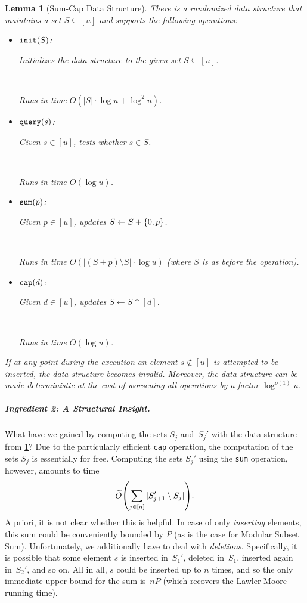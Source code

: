 \documentclass[10pt,a4paper]{article}
\newtheorem{lemma}{Lemma}[section]
\DeclarePairedDelimiter\parens{\lparen}{\rparen}
\DeclarePairedDelimiter\set{\lbrace}{\rbrace}
\newcommand\Order{O}
\newcommand\order{o}
\newcommand\Oo{O}
\newcommand{\Op}[1]{{\normalfont\texttt{#1}}}
\begin{document}
\begin{lemma}[Sum-Cap Data Structure]
    \label{lem:set_ds}
    There is a randomized data structure that maintains a set $S \subseteq [u]$ and supports the following operations:
    \smallskip
    \begin{itemize} 
        \item \parbox{2.2cm}{$\Op{init}(S)$:} Initializes the data structure to the given set $S \subseteq [u]$.\\\parbox{2.2cm}{~} Runs in time $\Oo(|S| \cdot \log u + \log^2 u)$.
        
        \item \parbox{2.2cm}{$\Op{query}(s)$:} Given $s \in [u]$, tests whether $s \in S$.\\\parbox{2.2cm}{~} Runs in time $\Oo(\log u)$.
        
        \item \parbox{2.2cm}{$\Op{sum}(p)$:} Given $p \in [u]$, updates $S \gets S + \set{0, p}$.\\\parbox{2.2cm}{~} Runs in time $\Oo(|(S+p)\setminus S| \cdot \log u)$ (where $S$ is as before the operation).

        \item \parbox{2.2cm}{$\Op{cap}(d)$:} Given $d \in [u]$, updates $S \gets S \cap [d]$.\\\parbox{2.2cm}{~} Runs in time $\Oo(\log u)$.
    \end{itemize}
    \smallskip
    If at any point during the execution an element $s \notin [u]$ is attempted to be inserted, the data structure becomes invalid. Moreover, the data structure can be made deterministic at the cost of worsening all operations by a factor $\log^{\order(1)} u$.
\end{lemma}

\subparagraph{Ingredient 2: A Structural Insight.}
What have we gained by computing the sets $S_j$ and~$S_j'$ with the data structure from \cref{lem:set_ds}? 
Due to the particularly efficient \Op{cap} operation, the computation of the sets $S_j$ is essentially for free.
Computing the sets $S_j'$ using the \Op{sum} operation, however, amounts to time
\begin{equation*}
    \widetilde\Order\parens*{\sum_{j \in [n]} |S_{j+1}' \setminus S_j|}.
\end{equation*}
A priori, it is not clear whether this is helpful. In case of only \emph{inserting} elements, this sum could be conveniently bounded by $P$ (as is the case for Modular Subset Sum). Unfortunately, we additionally have to deal with \emph{deletions}. Specifically, it is possible that some element $s$ is inserted in~$S_1'$, deleted in~$S_1$, inserted again in~$S_2'$, and so on. All in all, $s$ could be inserted up to $n$ times, and so the only immediate upper bound for the sum is~$nP$ (which recovers the Lawler-Moore running time).
\end{document}
